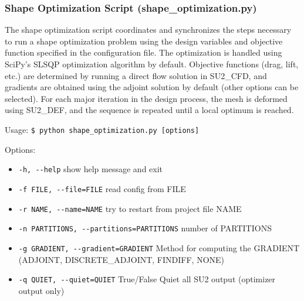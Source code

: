 \documentclass[12pt, a4paper, twoside]{article}
\begin{document}
    
    

\subsubsection{Shape Optimization Script (shape\_optimization.py)}

The shape optimization script coordinates and synchronizes the steps necessary to run a shape optimization problem using the design variables and objective function specified in the configuration file. The optimization is handled using SciPy’s SLSQP optimization algorithm by default. Objective functions (drag, lift, etc.) are determined by running a direct flow solution in SU2\_CFD, and gradients are obtained using the adjoint solution by default (other options can be selected). For each major iteration in the design process, the mesh is deformed using SU2\_DEF, and the sequence is repeated until a local optimum is reached.

Usage: \verb|$ python shape_optimization.py [options]|

Options:
\begin{itemize}
    \item \verb|-h, --help| show help message and exit
    \item \verb|-f FILE, --file=FILE| read config from FILE
    \item \verb|-r NAME, --name=NAME| try to restart from project file NAME
    \item \verb|-n PARTITIONS, --partitions=PARTITIONS| number of PARTITIONS
    \item \verb|-g GRADIENT, --gradient=GRADIENT| Method for computing the GRADIENT (ADJOINT, DISCRETE\_ADJOINT, FINDIFF, NONE)
    \item \verb|-q QUIET, --quiet=QUIET| True/False Quiet all SU2 output (optimizer output only)
\end{itemize}
    
\end{document}

